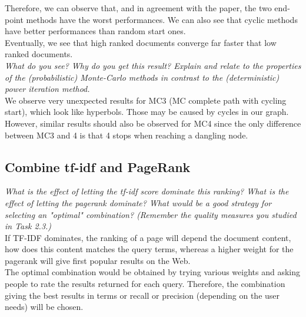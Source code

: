 \begin{itemize}
Therefore, we can observe that, and in agreement with the paper, the two end-point methods have the worst performances. We can also see that cyclic methods have better performances than random start ones.\\

Eventually, we see that high ranked documents converge far faster that low ranked documents.\\

\textit{What do you see? Why do you get this result? Explain and relate to the properties of the (probabilistic) Monte-Carlo methods in contrast to the (deterministic) power iteration method.}\\
We observe very unexpected results for MC3 (MC complete path with cycling start), which look like hyperbols. Those may be caused by cycles in our graph. However, similar results should also be observed for MC4 since the only difference between MC3 and 4 is that 4  stops when reaching a dangling node.

\subsection{Combine tf-idf and PageRank}

\textit{What is the effect of letting the tf-idf score dominate this ranking? What is the effect of letting the pagerank dominate? What would be a good strategy for selecting an "optimal" combination? (Remember the quality measures you studied in Task 2.3.)}\\

If TF-IDF dominates, the ranking of a page will depend the document content, how does this content matches the query terms, whereas a higher weight for the pagerank will give first popular results on the Web.\\

The optimal combination would be obtained by trying various weights and asking people to rate the results returned for each query. Therefore, the combination giving the best results in terms or recall or precision (depending on the user needs) will be chosen.

\end{itemize}
